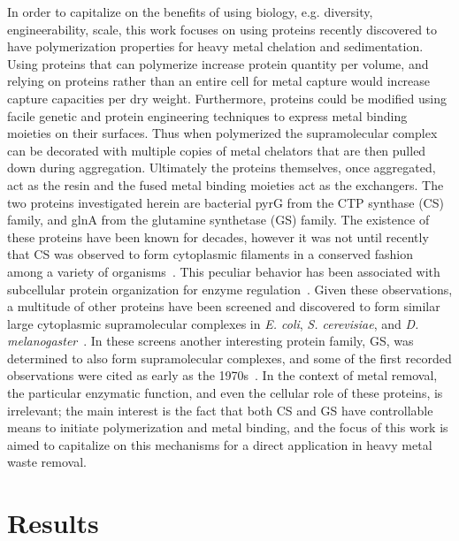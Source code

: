 \documentclass[../main/main]{subfiles}
\begin{document}
In order to capitalize on the benefits of using biology, e.g. diversity, engineerability, scale, this work focuses on using proteins recently discovered to have polymerization properties for heavy metal chelation and sedimentation. Using proteins that can polymerize increase protein quantity per volume, and relying on proteins rather than an entire cell for metal capture would increase capture capacities per dry weight. Furthermore, proteins could be modified using facile genetic and protein engineering techniques to express metal binding moieties on their surfaces. Thus when polymerized the supramolecular complex can be decorated with multiple copies of metal chelators that are then pulled down during aggregation. Ultimately the proteins themselves, once aggregated, act as the resin and the fused metal binding moieties act as the exchangers. The two proteins investigated herein are bacterial pyrG from the CTP synthase (CS) family, and glnA from the glutamine synthetase (GS) family. The existence of these proteins have been known for decades, however it was not until recently that CS was observed to form cytoplasmic filaments in a conserved fashion among a variety of organisms~\cite{robertson1995,ingerson-mahar2010,liu2011,carcamo2011,liu2010}.
This peculiar behavior has been associated with subcellular protein organization for enzyme regulation~\cite{ingerson-mahar2010,carcamo2011,liu2010}.
Given these observations, a multitude of other proteins have been screened and discovered to form similar large cytoplasmic supramolecular complexes in \textit{E. coli}, \textit{S. cerevisiae}, and \textit{D. melanogaster}~\cite{liu2010,narayanaswamy2009,noree2010}.
In these screens another interesting protein family, GS, was determined to also form supramolecular complexes, and some of the first recorded observations were cited as early as the 1970s~\cite{noree2010,eisenberg2000,valentine1968,miller1974}.
In the context of metal removal, the particular enzymatic function, and even the cellular role of these proteins, is irrelevant; the main interest is the fact that both CS and GS have controllable means to initiate polymerization and metal binding, and the focus of this work is aimed to capitalize on this mechanisms for a direct application in heavy metal waste removal.

\section{Results}
\end{document}
